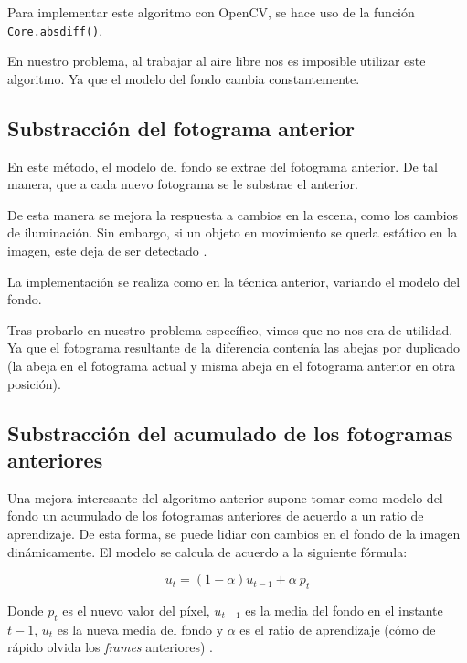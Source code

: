 Para implementar este algoritmo con OpenCV, se hace uso de la función
\texttt{Core.absdiff()}.

En nuestro problema, al trabajar al aire libre nos es imposible utilizar
este algoritmo. Ya que el modelo del fondo cambia constantemente.

\subsection{Substracción del fotograma anterior}\label{substraccion-del-fotograma-anterior}

En este método, el modelo del fondo se extrae del fotograma anterior. De
tal manera, que a cada nuevo fotograma se le substrae el anterior.

De esta manera se mejora la respuesta a cambios en la escena, como los
cambios de iluminación. Sin embargo, si un objeto en movimiento se queda
estático en la imagen, este deja de ser detectado
\citep{book:opencv_java}.

La implementación se realiza como en la técnica anterior, variando el
modelo del fondo.

Tras probarlo en nuestro problema específico, vimos que no nos era de
utilidad. Ya que el fotograma resultante de la diferencia contenía las
abejas por duplicado (la abeja en el fotograma actual y misma abeja en
el fotograma anterior en otra posición).

\subsection{Substracción del acumulado de los fotogramas anteriores}\label{substraccion-del-acumulado-de-los-fotogramas-anteriores}

Una mejora interesante del algoritmo anterior supone tomar como modelo
del fondo un acumulado de los fotogramas anteriores de acuerdo a un
ratio de aprendizaje. De esta forma, se puede lidiar con cambios en el
fondo de la imagen dinámicamente. El modelo se calcula de acuerdo a la
siguiente fórmula:

\begin{equation*}
    u_t = (1-\alpha )u_{t-1}+\alpha\ p_t
\end{equation*}

Donde $p_t$ es el nuevo valor del píxel, $u_{t-1}$ es la media del
fondo en el instante $t-1$, $u_t$ es la nueva media del fondo y
$\alpha$ es el ratio de aprendizaje (cómo de rápido olvida los \emph{frames}
anteriores) \citep{book:opencv_java}.

